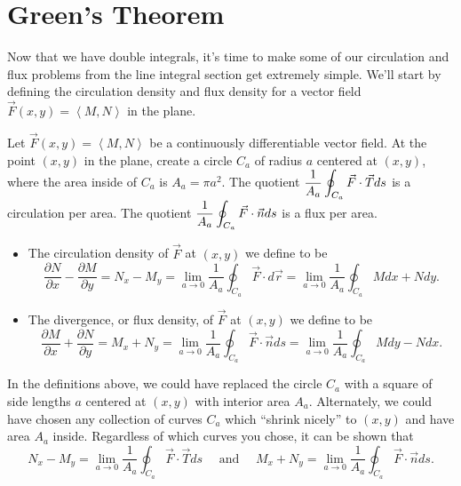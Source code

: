 \section{Green's Theorem}
Now that we have double integrals, it's time to make some of our circulation and flux problems from the line integral section get extremely simple. We'll start by defining the circulation density and flux density for a vector field $\vec F(x,y)=\left<M,N\right>$ in the plane.

\begin{definition}\label{definition of flux density in 2D}
Let $\vec F(x,y)=\left<M,N\right>$ be a continuously differentiable vector field. 
  At the point $(x,y)$ in the plane, create a circle $C_a$ of radius $a$ centered at $(x,y)$, where the area inside of $C_a$ is $A_a=\pi a^2$. The quotient $\displaystyle \frac{1}{A_a}\oint_{C_a} \vec F \cdot \vec T ds$ is a circulation per area.  The quotient $\displaystyle \frac{1}{A_a}\oint_{C_a} \vec F \cdot \vec n ds$ is a flux per area.
\begin{itemize}
 \item {}%
The circulation density of $\vec F$ at $(x,y)$ we define to be 
$$\frac{\partial N}{\partial x}-\frac{\partial M}{\partial y}=N_x-M_y = \lim_{a\to 0} \frac{1}{A_a}\oint_{C_a} \vec F \cdot  d\vec r = 
\lim_{a\to 0} \frac{1}{A_a}\oint_{C_a} Mdx+Ndy.$$ 
 \item The divergence, or flux density, of $\vec F$ at $(x,y)$ we define to be 
$$\frac{\partial M}{\partial x}+\frac{\partial N}{\partial y}=M_x+N_y=\lim_{a\to 0} \frac{1}{A_a}\oint_{C_a} \vec F \cdot \vec n ds = 
\lim_{a\to 0} \frac{1}{A_a}\oint_{C_a} Mdy-Ndx.$$
\end{itemize}
\end{definition}

In the definitions above, we could have replaced the circle $C_a$ with a square of side lengths $a$ centered at $(x,y)$ with interior area $A_a$. Alternately, we could have chosen any collection of curves $C_a$ which ``shrink nicely'' to $(x,y)$ and have area $A_a$ inside. Regardless of which curves you chose, it can be shown that 
$$N_x-M_y=\lim_{a\to 0} \frac{1}{A_a}\oint_{C_a} \vec F \cdot \vec T ds \quad \text{ and } \quad M_x+N_y=\lim_{a\to 0} \frac{1}{A_a}\oint_{C_a} \vec F \cdot \vec n ds.$$

